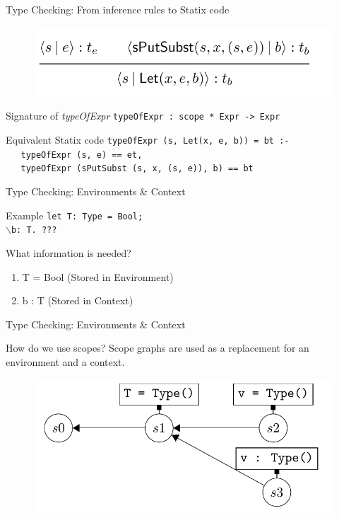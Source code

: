 \documentclass[aspectratio=43]{beamer}
\begin{document}
\begin{frame}[fragile]{Type Checking: From inference rules to Statix code}
	\begin{figure}
		\centering
		\includegraphics[width=0.8\linewidth]{img/screenshot004}
	\end{figure}
	
	\begin{block}{Signature of \emph{typeOfExpr}}
		\texttt{typeOfExpr : scope * Expr -> Expr}
	\end{block}
	
	\begin{exampleblock}{Equivalent Statix code} 
		\texttt{typeOfExpr (s, Let(x, e, b)) = bt :-\\
			\,\, typeOfExpr (s, e) == et, \\
			\,\, typeOfExpr (sPutSubst (s, x, (s, e)), b) == bt}
	\end{exampleblock}
\end{frame}

\begin{frame}[fragile]{Type Checking: Environments \& Context}
	\begin{exampleblock}{Example}
		\texttt{let T: Type = Bool;\\
			$\backslash$b: T. ???
		}
	\end{exampleblock}
	
	\begin{block}{What information is needed?}
		\begin{enumerate}
			\item T = Bool (Stored in Environment)
			\item b : T (Stored in Context)
		\end{enumerate}
	\end{block}
\end{frame}


\begin{frame}[fragile]{Type Checking: Environments \& Context}
	\begin{block}{How do we use scopes?}
		Scope graphs are used as a replacement for an environment and a context.
	\end{block}
	
	\begin{figure}
		\includegraphics[width=0.7\linewidth]{screenshot004}
	\end{figure}
	
\end{frame}
\end{document}
